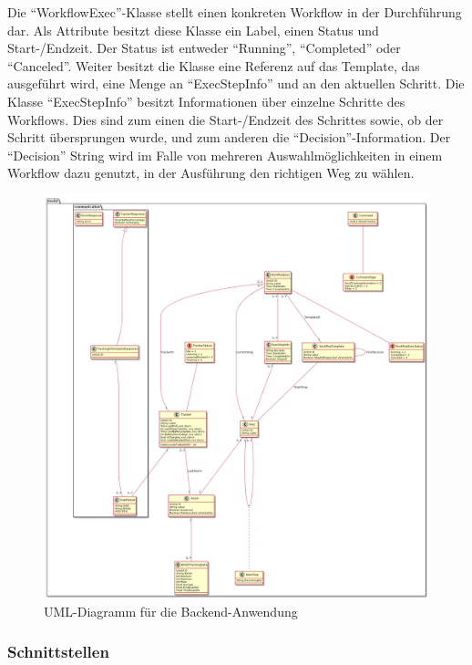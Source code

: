 Die \enquote{WorkflowExec}-Klasse stellt einen konkreten Workflow in der Durchführung dar.
Als Attribute besitzt diese Klasse ein Label, einen Status und Start-/Endzeit.
Der Status ist entweder \enquote{Running}, \enquote{Completed} oder \enquote{Canceled}.
Weiter besitzt die Klasse eine Referenz auf das Template, das ausgeführt wird, eine Menge an \enquote{ExecStepInfo} und an den aktuellen Schritt.
Die Klasse \enquote{ExecStepInfo} besitzt Informationen über einzelne Schritte des Workflows.
Dies sind zum einen die Start-/Endzeit des Schrittes sowie, ob der Schritt übersprungen wurde, und zum anderen die \enquote{Decision}-Information.
Der \enquote{Decision} String wird im Falle von mehreren Auswahlmöglichkeiten in einem Workflow dazu genutzt, in der Ausführung den richtigen Weg zu wählen.

\begin{figure}[h!tbp]
	\includegraphics[width=\textwidth]{images/uml.png}
	\centering
	\caption{UML-Diagramm für die Backend-Anwendung}
	\label{fig:uml}
\end{figure}

\FloatBarrier

\subsubsection{Schnittstellen}

